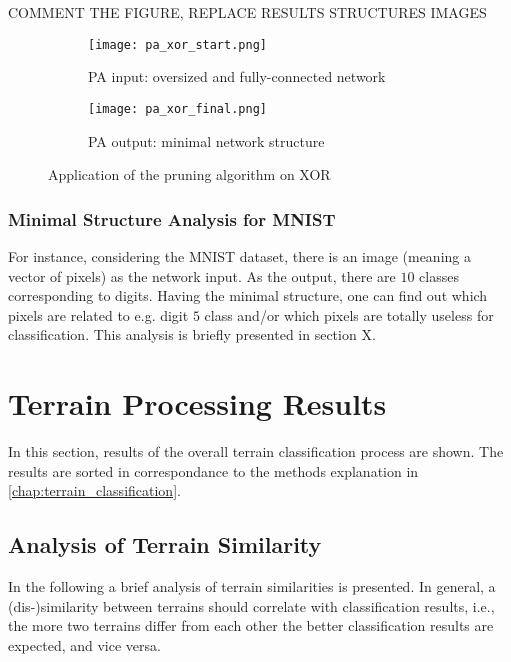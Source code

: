 COMMENT THE FIGURE, REPLACE RESULTS STRUCTURES IMAGES

\begin{figure}[H]
\centering
\begin{subfigure}{0.45\textwidth}
  \centering
  \texttt{[image: pa\_xor\_start.png]}
  \caption{PA input: oversized and fully-connected network}
  \label{img:pa_xor_start}
\end{subfigure}%
\begin{subfigure}{0.45\textwidth}
  \centering
  \texttt{[image: pa\_xor\_final.png]}
  \caption{PA output: minimal network structure}
  \label{img:pa_xor_final}
\end{subfigure}
\caption{Application of the pruning algorithm on XOR}
\label{img:pa_xor_morph}
\end{figure}

\newpage
\subsubsection{Minimal Structure Analysis for MNIST} \label{sssec:mnist_analysis}
For instance, considering the MNIST dataset, there is an image (meaning a vector of pixels) as the network input. As the output, there are $ 10 $ classes corresponding to digits. Having the minimal structure, one can find out which pixels are related to e.g. digit $ 5 $ class and/or which pixels are totally useless for classification. This analysis is briefly presented in section X.

\newpage
\section{Terrain Processing Results} \label{sec:terrain_processing_results}
In this section, results of the overall terrain classification process are shown. The results are sorted in correspondance to the methods explanation in \cref{chap:terrain_classification}.

\subsection{Analysis of Terrain Similarity} \label{ssec:terrains_analysis}
In the following a brief analysis of terrain similarities is presented. In general, a (dis-)similarity between terrains should correlate with classification results, i.e., the more two terrains differ from each other the better classification results are expected, and vice versa.

